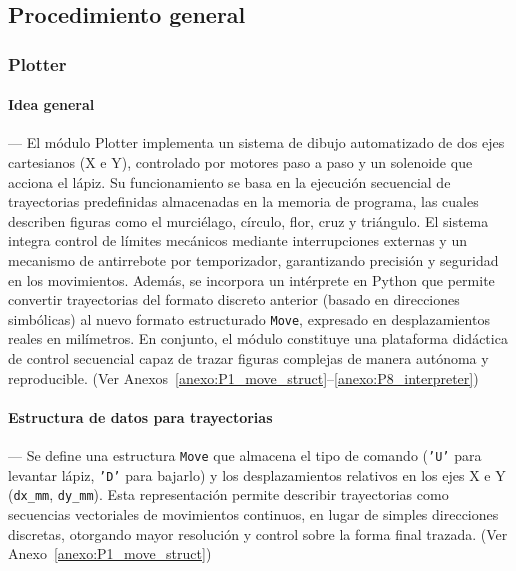 \subsection{Procedimiento general}

\vspace{1em}
\subsubsection{\textbf{Plotter}}

\paragraph*{\textbf{Idea general}}---
El módulo Plotter implementa un sistema de dibujo automatizado de dos ejes cartesianos (X e Y), controlado por motores paso a paso y un solenoide que acciona el lápiz. Su funcionamiento se basa en la ejecución secuencial de trayectorias predefinidas almacenadas en la memoria de programa, las cuales describen figuras como el murciélago, círculo, flor, cruz y triángulo. El sistema integra control de límites mecánicos mediante interrupciones externas y un mecanismo de antirrebote por temporizador, garantizando precisión y seguridad en los movimientos. Además, se incorpora un intérprete en Python que permite convertir trayectorias del formato discreto anterior (basado en direcciones simbólicas) al nuevo formato estructurado \texttt{Move}, expresado en desplazamientos reales en milímetros. En conjunto, el módulo constituye una plataforma didáctica de control secuencial capaz de trazar figuras complejas de manera autónoma y reproducible. (Ver Anexos~\ref{anexo:P1_move_struct}–\ref{anexo:P8_interpreter})

\vspace{1em}

\paragraph*{\textbf{Estructura de datos para trayectorias}}---
Se define una estructura \texttt{Move} que almacena el tipo de comando (\texttt{'U'} para levantar lápiz, \texttt{'D'} para bajarlo) y los desplazamientos relativos en los ejes X e Y (\texttt{dx\_mm}, \texttt{dy\_mm}). Esta representación permite describir trayectorias como secuencias vectoriales de movimientos continuos, en lugar de simples direcciones discretas, otorgando mayor resolución y control sobre la forma final trazada. (Ver Anexo~\ref{anexo:P1_move_struct})

